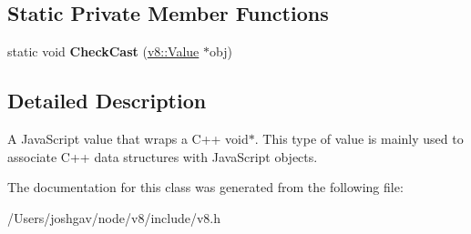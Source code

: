 \subsection*{Static Private Member Functions}
\begin{DoxyCompactItemize}
\item 
static void {\bfseries Check\+Cast} (\hyperlink{classv8_1_1_value}{v8\+::\+Value} $\ast$obj)\hypertarget{classv8_1_1_external_a7b48d794bfa03ee712090a13dbe885ab}{}\label{classv8_1_1_external_a7b48d794bfa03ee712090a13dbe885ab}

\end{DoxyCompactItemize}


\subsection{Detailed Description}
A Java\+Script value that wraps a C++ void$\ast$. This type of value is mainly used to associate C++ data structures with Java\+Script objects. 

The documentation for this class was generated from the following file\+:\begin{DoxyCompactItemize}
\item 
/\+Users/joshgav/node/v8/include/v8.\+h\end{DoxyCompactItemize}
